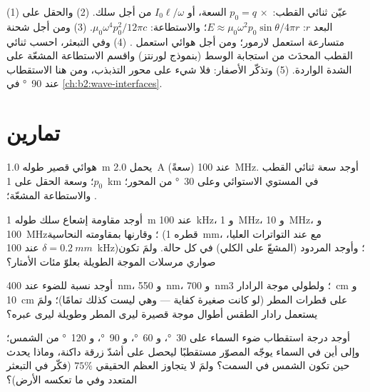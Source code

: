 \begin{method}\label{met:b2:dipole-radiation:method}
(1) عيّن ثنائي القطب: $p_0 = q\,\times$ السعة، أو $I_0\ell/\omega$ من أجل
سلك. (2) والحقل على البعد $r$: $E \approx \mu_0\omega^2p_0\sin\theta/4\pi r$؛ والاستطاعة:
$\mu_0\omega^4p_0^2/12\pi c$. (3) ومن أجل شحنة متسارعة استعمل لارمور؛ ومن أجل
هوائي استعمل . (4) وفي التبعثر، احسب ثنائي القطب
المحدَث من استجابة الوسط (بنموذج لورنتز) واقسم
الاستطاعة المشعّة على الشدة الواردة. (5) وتذكّر الأصفار:
فلا شيء على محور التذبذب، ومن هنا الاستقطاب عند
\qty{90}{\degree}  في \cref{ch:b2:wave-interfaces}.
\end{method}

\section{تمارين}

\begin{exercise}[$\star$]\label{exo:b2:dipole-radiation:1}
هوائي قصير طوله \qty{1.0}{m} يحمل \qty{2.0}{A} (سعةً) عند
\qty{100}{MHz}. أوجد سعة ثنائي القطب $p_0$؛ وسعة الحقل على \qty{1}{km} في
المستوي الاستوائي وعلى \qty{30}{\degree} من المحور؛ والاستطاعة المشعّة؛
.
\end{exercise}

\begin{exercise}[$\star$]\label{exo:b2:dipole-radiation:2}
أوجد مقاومة إشعاع سلك طوله \qty{1}{m} عند \qty{100}{kHz}، و \qty{1}{MHz}،
و \qty{10}{MHz}، و \qty{100}{MHz}؛ وقارنها بمقاومته النحاسية
(قطره \qty{1}{mm}، مع  عند التواترات العليا،
$\delta = \qty{0.2}{mm}$ عند \qty{100}{kHz})؛ وأوجد المردود (المشعّ على الكلي)
في كل حالة. ولمَ تكون صواري مرسلات الموجة الطويلة بعلوّ مئات
الأمتار؟
\end{exercise}

\begin{exercise}[$\star$]\label{exo:b2:dipole-radiation:3}
أوجد نسبة  للضوء عند \qty{400}{nm}، و \qty{550}{nm}، و
\qty{700}{nm}؛ ولطولي موجة الرادار \qty{3}{cm} و \qty{10}{cm} على
قطرات المطر (لو كانت صغيرة كفاية --- وهي ليست كذلك تمامًا)؛ ولمَ
يستعمل رادار الطقس أطوال موجة قصيرة ليرى المطر وطويلة ليرى
عبره؟
\end{exercise}

\begin{exercise}[$\star$]\label{exo:b2:dipole-radiation:4}
أوجد درجة استقطاب ضوء السماء على \qty{30}{\degree}، و \qty{60}{\degree}،
و \qty{90}{\degree}، و \qty{120}{\degree} من الشمس؛ وإلى أين في السماء يوجّه
المصوّر مستقطبًا ليحصل على أشدّ زرقة داكنة، وماذا
يحدث حين تكون الشمس في السمت؟ ولمَ لا يتجاوز العظم الحقيقي
$75\%$ (فكّر في التبعثر المتعدد وفي ما تعكسه الأرض)؟
\end{exercise}

